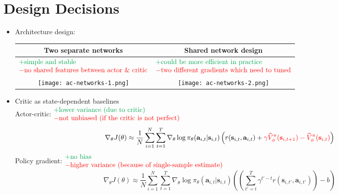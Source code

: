 \section{Design Decisions}
\begin{itemize}
	\item Architecture design:
	\begin{table}[hbt!]
		\centering
		\begin{tabular}{c|c}
			Two separate networks & Shared network design\\
			\hline\hline
			$\begin{matrix*}[l]
				\color{Green} + \text{simple and stable}\\
				\color{red} - \text{no shared features between actor \& critic}
			\end{matrix*}$ & $\begin{matrix*}[l]
				\color{Green} + \text{could be more efficient in practice}\\
				\color{red} - \text{two different gradients which need to tuned}
			\end{matrix*}$ \\ 
			\texttt{[image: ac-networks-1.png]} &
			\texttt{[image: ac-networks-2.png]}
		\end{tabular}
	\end{table}	
	\item Critic as state-dependent baselines\\
	Actor-critic: $\begin{matrix*}[l]
		\color{Green}+\text{lower variance (due to critic)}\\
		\color{red}-\text{not unbiased (if the critic is not perfect)}
	\end{matrix*}$
	\[\nabla_\theta J(\theta) \approx \frac{1}{N} \sum_{i=1}^N \sum_{t=1}^T \nabla_\theta\log\pi_{\theta}(\textbf{a}_{i,t}|\textbf{s}_{i,t}) \left( r(\textbf{s}_{i,t}, \textbf{a}_{i,t}) + {\color{red}\gamma\widehat{V}_\phi^\pi(\textbf{s}_{i,t+1}) - \widehat{V}_\phi^\pi(\textbf{s}_{i,t})} \right)\]
	Policy gradient: $\begin{matrix*}[l]
		\color{Green}+ \text{no bias}\\
		\color{red}- \text{higher variance (because of single-sample estimate)}
	\end{matrix*}$
	\[\nabla_\theta J(\theta) \approx \frac{1}{N} \sum_{i=1}^N \sum_{t=1}^T \nabla_\theta\log\pi_{\theta}(\textbf{a}_{i,t}|\textbf{s}_{i,t}) \left( \left( \sum_{t' = t}^T \gamma^{t'-t} r(\textbf{s}_{i,t'}, \textbf{a}_{i,t'}) \right) -b \right)\]

\end{itemize}
